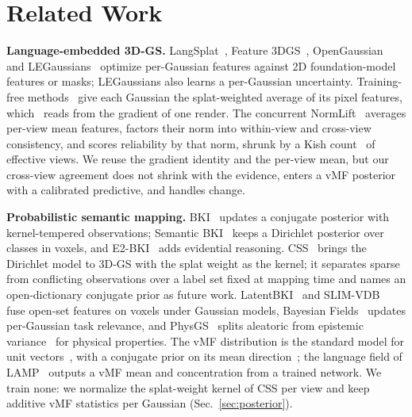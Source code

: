 \documentclass[journal]{IEEEtran}
\newcommand{\secref}[1]{Sec.~\mbox{\ref{#1}}}       %
\begin{document}
\section{Related Work}
\label{sec:related}

\textbf{Language-embedded 3D-GS.} LangSplat~\cite{qin2024langsplat}, Feature 3DGS~\cite{zhou2024feature}, OpenGaussian~\cite{wu2024opengaussian} and LEGaussians~\cite{shi2024legaussians} optimize per-Gaussian features against 2D foundation-model features or masks; LEGaussians also learns a per-Gaussian uncertainty. Training-free methods~\cite{cheng2025occam, joseph2025gradbp} give each Gaussian the splat-weighted average of its pixel features, which~\cite{joseph2025gradbp} reads from the gradient of one render. The concurrent NormLift~\cite{zang2026normlift} averages per-view mean features, factors their norm into within-view and cross-view consistency, and scores reliability by that norm, shrunk by a Kish count~\cite{kish1965survey} of effective views. We reuse the gradient identity and the per-view mean, but our cross-view agreement does not shrink with the evidence, enters a vMF posterior with a calibrated predictive, and handles change.

\textbf{Probabilistic semantic mapping.} BKI~\cite{vegabrown2014} updates a conjugate posterior with kernel-tempered observations; Semantic BKI~\cite{gan2020bayesian} keeps a Dirichlet posterior over classes in voxels, and E2-BKI~\cite{kim2025e2bki} adds evidential reasoning. CSS~\cite{wilson2025css} brings the Dirichlet model to 3D-GS with the splat weight as the kernel; it separates sparse from conflicting observations over a label set fixed at mapping time and names an open-dictionary conjugate prior as future work. LatentBKI~\cite{wilson2025latentbki} and SLIM-VDB~\cite{sheppard2026slimvdb} fuse open-set features on voxels under Gaussian models, Bayesian Fields~\cite{maggio2025bayesian} updates per-Gaussian task relevance, and PhysGS~\cite{chopra2026physgs} splits aleatoric from epistemic variance~\cite{kendall2017uncertainties} for physical properties. The vMF distribution is the standard model for unit vectors~\cite{mardia2000directional, banerjee2005vmf}, with a conjugate prior on its mean direction~\cite{mardia1976bayesian}; the language field of LAMP~\cite{lee2026lamp} outputs a vMF mean and concentration from a trained network. We train none: we normalize the splat-weight kernel of CSS per view and keep additive vMF statistics per Gaussian (\secref{sec:posterior}).
\end{document}
